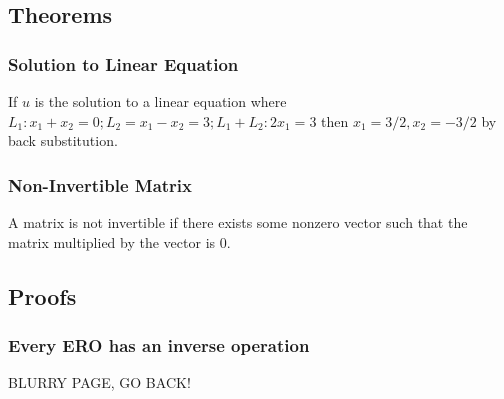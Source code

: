   \subsection{Theorems}
  
    \subsubsection{Solution to Linear Equation}
    
      If $u$ is the solution to a linear equation where $L_1: x_1 + x_2 = 0; L_2 = x_1 - x_2 = 3; L_1 + L_2: 2x_1 = 3$ then $x_1 = 3/2, x_2 = -3/2$ by back substitution.
      
    \subsubsection{Non-Invertible Matrix}

      A matrix is not invertible if there exists some nonzero vector such that the matrix multiplied by the vector is 0.

    

  \subsection{Proofs}

    \subsubsection{Every ERO has an inverse operation}

      BLURRY PAGE, GO BACK!
